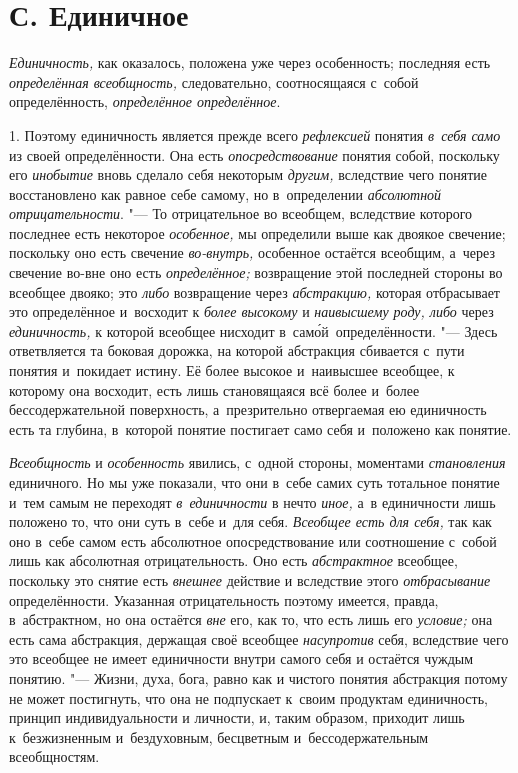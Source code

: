 \section[С. Единичное]{С. Единичное}

{\em Единичность,} как оказалось, положена уже через особенность; последняя
есть {\em определённая всеобщность,} следовательно, соотносящаяся с~собой
определённость, {\em определённое определённое}.

1. Поэтому единичность является прежде всего {\em рефлексией} понятия
{\em в~себя само} из своей определённости. Она есть {\em опосредствование}
понятия собой, поскольку его {\em инобытие} вновь сделало себя некоторым
{\em другим,} вследствие чего понятие восстановлено как равное себе самому,
но в~определении {\em абсолютной отрицательности}. "--- То отрицательное во
всеобщем, вследствие которого последнее есть некоторое {\em особенное,} мы
определили выше
как двоякое свечение; поскольку оно есть свечение {\em во-внутрь,}
особенное остаётся всеобщим, а~через свечение во-вне оно есть
{\em определённое;} возвращение этой последней стороны во всеобщее двояко; это
{\em либо} возвращение через {\em абстракцию,}
которая отбрасывает это определённое и~восходит к {\em более высокому} и
{\em наивысшему роду, либо} через {\em единичность,} к
которой всеобщее нисходит в~сам\'{о}й~определённости. "--- Здесь
ответвляется та боковая дорожка, на которой абстракция сбивается с~пути
понятия и~покидает истину. Её более высокое и~наивысшее всеобщее, к
которому она восходит, есть лишь становящаяся всё более и~более
бессодержательной поверхность, а~презрительно отвергаемая ею единичность
есть та глубина, в~которой понятие постигает само себя и~положено как понятие.

{\em Всеобщность} и {\em особенность} явились, с~одной стороны, моментами
{\em становления} единичного. Но мы уже показали, что они в~себе самих суть
тотальное понятие и~тем самым не переходят {\em в~единичности} в
нечто {\em иное,} а~в единичности лишь положено то, что они суть
в~себе и~для себя. {\em Всеобщее есть для себя,}
так как оно в~себе самом есть абсолютное опосредствование или
соотношение с~собой лишь как абсолютная отрицательность. Оно есть
{\em абстрактное} всеобщее, поскольку это снятие есть {\em внешнее} действие
и вследствие этого {\em отбрасывание}
определённости. Указанная отрицательность поэтому имеется,
правда, в~абстрактном, но она остаётся {\em вне} его, как то,
что есть лишь его {\em условие;}
она есть сама абстракция, держащая своё всеобщее {\em насупротив} себя,
вследствие чего это всеобщее не имеет единичности внутри самого себя и
остаётся чуждым понятию. "--- Жизни, духа, бога, равно как и
чистого понятия абстракция потому не может постигнуть, что она не
подпускает к~своим продуктам единичность, принцип индивидуальности и
личности, и, таким образом, приходит лишь к~безжизненным и~бездуховным,
бесцветным и~бессодержательным всеобщностям.

